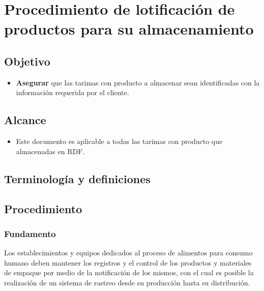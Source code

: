 \renewcommand{\MayorVer}{2}
\renewcommand{\MenorVer}{1}
\renewcommand{\Codigo}{PSA-2-PRO} 
\renewcommand{\FechaPub}{2023--01}
\renewcommand{\Titulo}{Procedimiento de lotificación de productos para su almacenamiento}

\section{\Titulo}


\subsection{Objetivo}

\begin{itemize}
	\item \textbf{Asegurar} que las tarimas con producto a almacenar sean identificadas con la información requerida por el cliente.
\end{itemize}

\subsection{Alcance}

\begin{itemize}
	\item Este documento es aplicable a todas las tarimas con producto que almacenadas en RDF.
\end{itemize}

\subsection{Terminología y definiciones}

\subsection{Procedimiento}

\subsubsection{Fundamento}

Los establecimientos y equipos dedicados al proceso de alimentos para consumo humano deben mantener los registros y el control de los productos y materiales de empaque por medio de la notificación de los mismos, con el cual es posible la realización de un sistema de rastreo desde su producción hasta su distribución.

